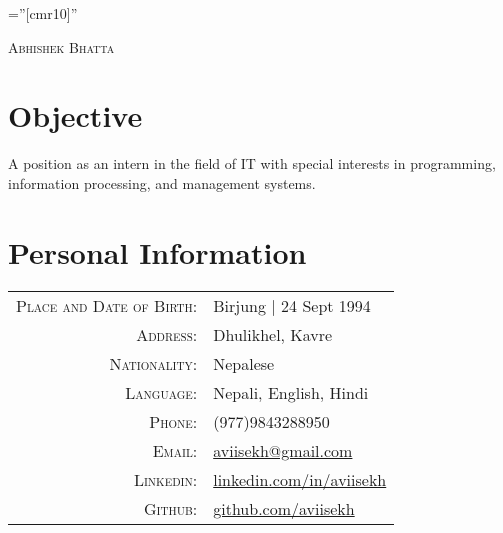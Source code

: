 \documentclass[a4paper,10pt]{article}
\begin{document}

\pagestyle{empty} %

\font\fb=''[cmr10]'' %

\par{\centering
		{\huge \textsc{Abhishek Bhatta}
	}\bigskip\par}

\section{Objective}
A position as an intern in the field of IT with special interests in programming, information processing, and management systems.

\section{Personal Information}

\begin{tabular}{rl}
    \textsc{Place and Date of Birth:} & Birjung  | 24 Sept 1994 \\
    \textsc{Address:}   & Dhulikhel, Kavre \\
    \textsc{Nationality:} & Nepalese\\
    \textsc{Language:} & Nepali, English, Hindi\\
    \textsc{Phone:}     & (977)9843288950\\
    \textsc{Email:}     & \href{mailto:aviisekh@gmail.com}{aviisekh@gmail.com}\\
    \textsc{Linkedin:} & \href{https://www.linkedin.com/in/aviisekh}{linkedin.com/in/aviisekh}\\
    \textsc{Github:} & \href{https://www.github.com/aviisekh}{github.com/aviisekh}\\
\end{tabular}

\end{document}
